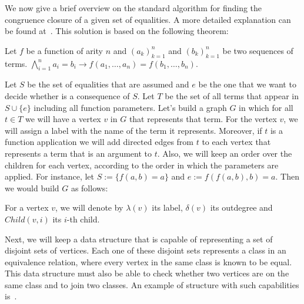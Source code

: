 We now give a brief overview on the standard algorithm for finding the congruence closure of a given set of equalities. A more detailed explanation can be found at~\cite{orig_cong_clos}. This solution is based on the following theorem:

\begin{theorem}[Congruence]
Let $f$ be a function of arity $n$ and ${(a_{k})}_{k = 1}^{n}$ and ${(b_{k})}_{k = 1}^{n}$ be two sequences of terms. $\bigwedge_{i = 1}^{n} a_{i} = b_{i} \rightarrow f(a_{1}, \ldots, a_{n}) = f(b_{1}, \ldots, b_{n})$.
\end{theorem}

Let $S$ be the set of equalities that are assumed and $e$ be the one that we want to decide whether is a consequence of $S$. Let $T$ be the set of all terms that appear in $S \cup \{e\}$ including all function parameters. Let's build a graph $G$ in which for all $t \in T$ we will have a vertex $v$ in $G$ that represents that term. For the vertex $v$, we will assign a label with the name of the term it represents. Moreover, if $t$ is a function application we will add directed edges from $t$ to each vertex that represents a term that is an argument to $t$. Also, we will keep an order over the children for each vertex, according to the order in which the parameters are applied. For instance, let $S := \{f(a, b) = a\}$ and $e := f(f(a, b), b) = a$. Then we would build $G$ as follows:

\begin{figure}[h]
\centering
{}
\end{figure}

For a vertex $v$, we will denote by $\lambda(v)$ its label, $\delta(v)$ its outdegree and $Child(v, i)$ its $i$-th child.

Next, we will keep a data structure that is capable of representing a set of disjoint sets of vertices. Each one of these disjoint sets represents a class in an equivalence relation, where every vertex in the same class is known to be equal. This data structure must also be able to check whether two vertices are on the same class and to join two classes. An example of structure with such capabilities is~\cite{union_find}.


